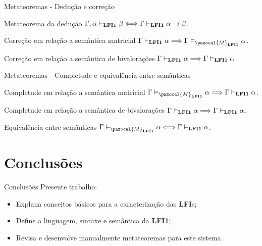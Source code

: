 \documentclass[xcolor=table]{beamer}
\newcommand{\lfium}{{\normalfont\textbf{LFI1}}}
\newcommand{\lfis}{{\normalfont\textbf{LFI}s}}
\newcommand{\conmat}{\vDash_{\pazocal{M}_{\lfium{}}}}
\newcommand{\conval}{\vDash_{\lfium{}}}
\newcommand{\conhil}{\vdash_{\lfium{}}}
\begin{document}
    \begin{frame}{Metateoremas {-} Dedução e correção}
        \begin{block}{Metateorema da dedução}
            $\Gamma, \alpha \conhil \beta \Longleftrightarrow \Gamma \conhil \alpha \to \beta$.
        \end{block}

        \begin{block}{Correção em relação a semântica matricial}
            $\Gamma \conhil \alpha \Longrightarrow \Gamma \conmat \alpha$.
        \end{block}
    
        \begin{block}{Correção em relação a semântica de bivalorações}
            $\Gamma \conhil \alpha \Longrightarrow \Gamma \conval \alpha$.
        \end{block}

    \end{frame}

    \begin{frame}{Metateoremas {-} Completude e equivalência entre semânticas}
        \begin{block}{Completude em relação a semântica matricial}
            $\Gamma \conmat \alpha \Longrightarrow \Gamma \conhil \alpha$.
        \end{block}

        \begin{block}{Completude em relação a semântica de bivalorações}
           $\Gamma \conval \alpha \Longrightarrow \Gamma \conhil \alpha$.
        \end{block}

        \begin{block}{Equivalência entre semânticas}
            $\Gamma \conmat \alpha \Longleftrightarrow \Gamma \conval \alpha$.
        \end{block}
    \end{frame}
        

\section[]{Conclusões}
    \begin{frame}{Conclusões}
        Presente trabalho:
        \begin{itemize}
            \item Explana conceitos básicos para a caracterização das \lfis{};
            \item Define a linguagem, sintaxe e semântica da \lfium{};
            \item Revisa e desenvolve manualmente metateoremas para este sistema.
        \end{itemize}
    \end{frame}
\end{document}
